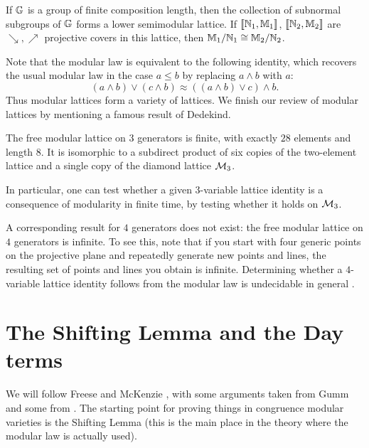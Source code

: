 \begin{appendices}
\begin{prop} If $\mathbb{G}$ is a group of finite composition length, then the collection of subnormal subgroups of $\mathbb{G}$ forms a lower semimodular lattice. If $\llbracket \mathbb{N}_1, \mathbb{M}_1 \rrbracket$, $\llbracket \mathbb{N}_2, \mathbb{M}_2 \rrbracket$ are $\searrow, \nearrow$ projective covers in this lattice, then $\mathbb{M}_1/\mathbb{N}_1 \cong \mathbb{M}_2/\mathbb{N}_2$.
\end{prop}

Note that the modular law is equivalent to the following identity, which recovers the usual modular law in the case $a \le b$ by replacing $a \wedge b$ with $a$:
\[
(a \wedge b) \vee (c \wedge b) \approx ((a \wedge b) \vee c) \wedge b.
\]
Thus modular lattices form a variety of lattices. We finish our review of modular lattices by mentioning a famous result of Dedekind.

\begin{prop} The free modular lattice on $3$ generators is finite, with exactly $28$ elements and length $8$. It is isomorphic to a subdirect product of six copies of the two-element lattice and a single copy of the diamond lattice $\mathcal{M}_3$.

In particular, one can test whether a given $3$-variable lattice identity is a consequence of modularity in finite time, by testing whether it holds on $\mathcal{M}_3$.
\end{prop}

A corresponding result for $4$ generators does not exist: the free modular lattice on $4$ generators is infinite. To see this, note that if you start with four generic points on the projective plane and repeatedly generate new points and lines, the resulting set of points and lines you obtain is infinite. Determining whether a $4$-variable lattice identity follows from the modular law is undecidable in general \cite{free-modular-undecidable}.


\section{The Shifting Lemma and the Day terms}\label{s-shifting}

We will follow Freese and McKenzie \cite{commutator-theory}, with some arguments taken from Gumm \cite{gumm-geometric} and some from \cite{commutator-notes}. The starting point for proving things in congruence modular varieties is the Shifting Lemma (this is the main place in the theory where the modular law is actually used).


\end{appendices}
